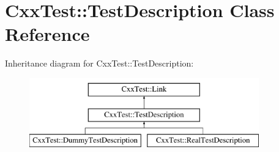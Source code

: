 \hypertarget{classCxxTest_1_1TestDescription}{\section{Cxx\-Test\-:\-:Test\-Description Class Reference}
\label{classCxxTest_1_1TestDescription}
}
Inheritance diagram for Cxx\-Test\-:\-:Test\-Description\-:\begin{figure}[H]
\begin{center}
\leavevmode
\includegraphics[height=3.000000cm]{classCxxTest_1_1TestDescription}
\end{center}
\end{figure}
